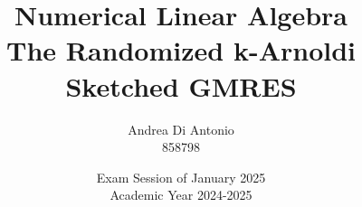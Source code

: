 
\newcommand{\documenttitle}{The Randomized k-Arnoldi Sketched GMRES}
\newcommand{\documentsubtitle}{k-sGMRES}

\newcommand{\documentauthor}{Andrea Di Antonio}
\newcommand{\documentdate}{Exam Session of January 2025 \\ Academic Year 2024-2025}

\title{Numerical Linear Algebra \\ \textbf{\documenttitle}}
\author{\documentauthor \\ 858798}
\date{\documentdate}

\newcommand{\accentcolor}{solarized-blue} %
\newcommand{\urlcolor}{solarized-red} %